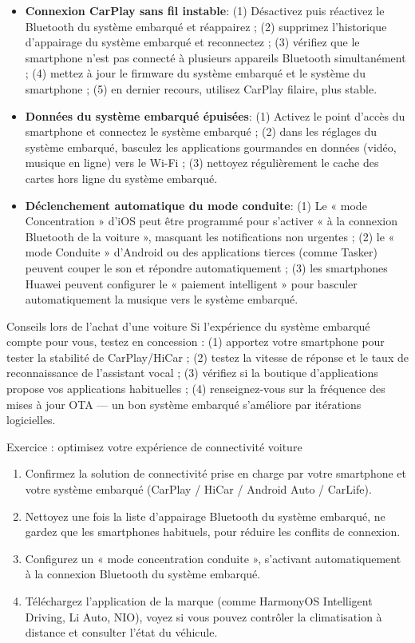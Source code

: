 \begin{itemize}
  \item \textbf{Connexion CarPlay sans fil instable}: (1) Désactivez puis réactivez le Bluetooth du système embarqué et réappairez ; (2) supprimez l'historique d'appairage du système embarqué et reconnectez ; (3) vérifiez que le smartphone n'est pas connecté à plusieurs appareils Bluetooth simultanément ; (4) mettez à jour le firmware du système embarqué et le système du smartphone ; (5) en dernier recours, utilisez CarPlay filaire, plus stable.
  \item \textbf{Données du système embarqué épuisées}: (1) Activez le point d'accès du smartphone et connectez le système embarqué ; (2) dans les réglages du système embarqué, basculez les applications gourmandes en données (vidéo, musique en ligne) vers le Wi-Fi ; (3) nettoyez régulièrement le cache des cartes hors ligne du système embarqué.
  \item \textbf{Déclenchement automatique du mode conduite}: (1) Le « mode Concentration » d'iOS peut être programmé pour s'activer « à la connexion Bluetooth de la voiture », masquant les notifications non urgentes ; (2) le « mode Conduite » d'Android ou des applications tierces (comme Tasker) peuvent couper le son et répondre automatiquement ; (3) les smartphones Huawei peuvent configurer le « paiement intelligent » pour basculer automatiquement la musique vers le système embarqué.
\end{itemize}

\begin{tcbinfo}{Conseils lors de l'achat d'une voiture}
Si l'expérience du système embarqué compte pour vous, testez en concession : (1) apportez votre smartphone pour tester la stabilité de CarPlay/HiCar ; (2) testez la vitesse de réponse et le taux de reconnaissance de l'assistant vocal ; (3) vérifiez si la boutique d'applications propose vos applications habituelles ; (4) renseignez-vous sur la fréquence des mises à jour OTA — un bon système embarqué s'améliore par itérations logicielles.

\end{tcbinfo}

\begin{tcbpractice}{Exercice : optimisez votre expérience de connectivité voiture}
\begin{enumerate}
  \item Confirmez la solution de connectivité prise en charge par votre smartphone et votre système embarqué (CarPlay / HiCar / Android Auto / CarLife).
  \item Nettoyez une fois la liste d'appairage Bluetooth du système embarqué, ne gardez que les smartphones habituels, pour réduire les conflits de connexion.
  \item Configurez un « mode concentration conduite », s'activant automatiquement à la connexion Bluetooth du système embarqué.
  \item Téléchargez l'application de la marque (comme HarmonyOS Intelligent Driving, Li Auto, NIO), voyez si vous pouvez contrôler la climatisation à distance et consulter l'état du véhicule.
\end{enumerate}

\end{tcbpractice}

